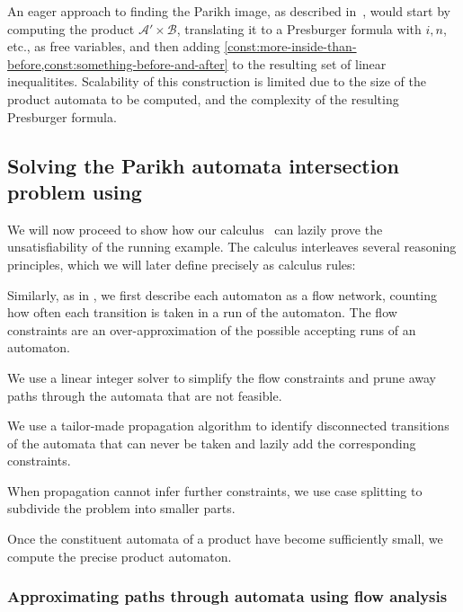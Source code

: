 An eager approach to finding the Parikh
image, as described in~\cite{generate-parikh-image}, would start by
computing the product $\mathcal{A}' \times \mathcal{B}$, translating it to a Presburger formula with
$i, n$, etc., as free variables, and then adding
\cref{const:more-inside-than-before,const:something-before-and-after} to the
resulting set of linear inequalitites. Scalability of this
construction is limited due to the size of the product automata to be computed,
and the complexity of the resulting Presburger formula.

\subsection{Solving the Parikh automata intersection problem using \Calculus{}}

We will now proceed to show how our calculus~\Calculus{} can lazily
prove the unsatisfiability of the running example. The calculus
interleaves several reasoning principles, which we will later
define precisely as calculus rules:
\begin{inparaenum}[(i)]
\item Similarly, as in \cite{generate-parikh-image}, we first describe
  each automaton as a flow network, counting how often each transition
  is taken in a run of the automaton. The flow constraints are an
  over-approximation of the possible accepting runs of an automaton.
\item We use a linear integer solver to simplify the flow constraints
  and prune away paths through the automata that are not feasible.
\item We use a tailor-made propagation algorithm to identify disconnected
  transitions of the automata that can never be taken and lazily add
  the corresponding constraints.
\item When propagation cannot infer further constraints, we use case
  splitting to subdivide the problem into smaller parts.
\item Once the constituent automata of a product have become
  sufficiently small, we compute the precise product automaton.
\end{inparaenum}

\subsubsection{Approximating paths through automata using flow analysis}\label{sec:a_1}

